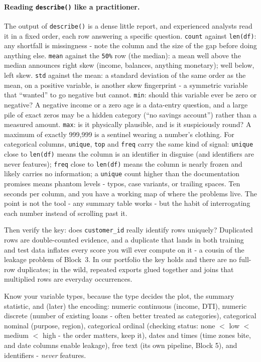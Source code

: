 \documentclass[11pt,a4paper]{article}
\begin{document}
\paragraph{Reading \texttt{describe()} like a practitioner.} The output of
\texttt{describe()} is a dense little report, and experienced analysts read
it in a fixed order, each row answering a specific question. \texttt{count}
against \texttt{len(df)}: any shortfall is missingness - note the column
and the size of the gap before doing anything else. \texttt{mean} against
the \texttt{50\%} row (the median): a mean well above the median announces
right skew (income, balances, anything monetary); well below, left skew.
\texttt{std} against the mean: a standard deviation of the same order as
the mean, on a positive variable, is another skew fingerprint - a
symmetric variable that ``wanted'' to go negative but cannot. \texttt{min}:
should this variable ever be zero or negative? A negative income or a
zero age is a data-entry question, and a large pile of exact zeros may be
a hidden category (``no savings account'') rather than a measured amount.
\texttt{max}: is it physically plausible, and is it suspiciously round?
A maximum of exactly 999{,}999 is a sentinel wearing a number's clothing.
For categorical columns, \texttt{unique}, \texttt{top} and \texttt{freq}
carry the same kind of signal: \texttt{unique} close to \texttt{len(df)}
means the column is an identifier in disguise (and identifiers are never
features); \texttt{freq} close to \texttt{len(df)} means the column is
nearly frozen and likely carries no information; a \texttt{unique} count
higher than the documentation promises means phantom levels - typos, case
variants, or trailing spaces. Ten seconds per column, and you have a
working map of where the problems live. The point is not the tool - any
summary table works - but the habit of interrogating each number instead
of scrolling past it.

Then verify the key: does \texttt{customer\_id} really identify rows
uniquely? Duplicated rows are double-counted evidence, and a duplicate that
lands in both training and test data inflates every score you will ever
compute on it - a cousin of the leakage problem of Block~3. In our
portfolio the key holds and there are no full-row duplicates; in the wild,
repeated exports glued together and joins that multiplied rows are everyday
occurrences.

Know your variable types, because the type decides the plot, the summary
statistic, and (later) the encoding: numeric continuous (income, DTI),
numeric discrete (number of existing loans - often better treated as
categories), categorical nominal (purpose, region), categorical ordinal
(checking status: none $<$ low $<$ medium $<$ high - the order matters,
keep it), dates and times (time zones bite, and date columns enable
leakage), free text (its own pipeline, Block 5), and identifiers -
\emph{never} features.
\end{document}
